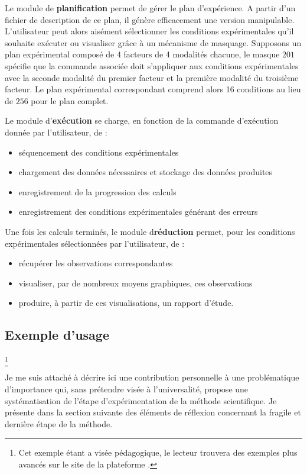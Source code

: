 Le module de \textbf{planification} permet de gérer le plan d'expérience. A partir d'un fichier de description de ce plan, il génère efficacement une version manipulable. L'utilisateur peut alors aisément sélectionner les conditions expérimentales qu'il souhaite exécuter ou visualiser grâce à un mécanisme de masquage. Supposons un plan expérimental composé de 4 facteurs de 4 modalités chacune, le masque ${2 0 1}$ spécifie que la commande associée doit s'appliquer aux conditions expérimentales avec la seconde modalité du premier facteur et la première modalité du troisième facteur. Le plan expérimental correspondant comprend alors 16 conditions au lieu de  $256$ pour le plan complet.

Le module d'\textbf{exécution} se charge, en fonction de la commande d'exécution donnée par l'utilisateur, de :
\begin{itemize}
  \item séquencement des conditions expérimentales
  \item chargement des données nécessaires et stockage des données produites
  \item enregistrement de la progression des calculs
  \item enregistrement des conditions expérimentales générant des erreurs
\end{itemize}

Une fois les calculs terminés, le module d\textbf{réduction} permet, pour les conditions expérimentales sélectionnées par l'utilisateur, de :
\begin{itemize}
  \item récupérer les observations correspondantes
  \item visualiser, par de nombreux moyens graphiques, ces observations
  \item produire, à partir de ces visualisations, un rapport d'étude.
\end{itemize}

\subsection{\nmu Exemple d'usage}



\footnote{Cet exemple étant a visée pédagogique, le lecteur trouvera des exemples plus avancés sur le site de la plateforme \explanes.}

Je me suis attaché à décrire ici une contribution personnelle à une problématique d'importance qui, sans prétendre visée à l'universalité, propose une systématisation de l'étape d'expérimentation de la méthode scientifique. Je présente dans la section suivante des éléments de réflexion concernant la fragile et dernière étape de la méthode.

